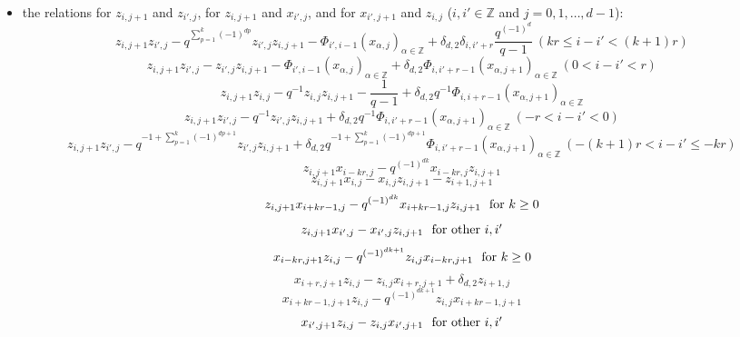 \documentclass[reqno,12pt,a4paper]{amsart}
\theoremstyle{remark}
\theoremstyle{definition}
\numberwithin{equation}{section}
\begin{document}
\begin{itemize}
	
	\item[(2)] the relations for $z_{i,j+1}$ and $z_{i',j}$, for $z_{i,j+1}$ and $x_{i',j}$, and for $x_{i',j+1}$ and $z_{i,j}$ ($i,i'\in\mathbb{Z}$ and $j=0,1,\ldots,d-1$):
	\begin{equation*}
		z_{i,j+1}z_{i',j}-q^{\sum\limits_{p=1}^{k}(-1)^{dp}  }z_{i',j}z_{i,j+1}-\Phi_{i',i-1}(x_{\alpha,j})_{\alpha\in\mathbb{Z}}+\delta_{d,2}\delta_{i,i'+r}\frac{q^{(-1)^d}}{q-1}~(kr\leq i-i'<(k+1)r)
	\end{equation*}
	\begin{equation}\label{relation:simple-by-projectives-$r>1$}
		z_{i,j+1}z_{i',j}-z_{i',j}z_{i,j+1}-\Phi_{i',i-1}(x_{\alpha,j})_{\alpha\in\mathbb{Z}}+\delta_{d,2}\Phi_{i,i'+r-1}(x_{\alpha,j+1})_{\alpha\in\mathbb{Z}}~(0< i-i'<r)
	\end{equation}
	\begin{equation*}
		z_{i,j+1}z_{i,j}-q^{-1}z_{i,j}z_{i,j+1}-\frac{1}{q-1}+\delta_{d,2}q^{-1}\Phi_{i,i+r-1}(x_{\alpha,j+1})_{\alpha\in\mathbb{Z}}
	\end{equation*}
	\begin{equation*}
		z_{i,j+1}z_{i',j}-q^{-1}z_{i',j}z_{i,j+1}+\delta_{d,2}q^{-1}\Phi_{i,i'+r-1}(x_{\alpha,j+1})_{\alpha\in\mathbb{Z}}~(-r< i-i'<0)
	\end{equation*}
	\begin{equation*}
		z_{i,j+1}z_{i',j}-q^{-1+\sum\limits_{p=1}^{k}(-1)^{dp+1}}z_{i',j}z_{i,j+1}+\delta_{d,2}q^{-1+\sum\limits_{p=1}^{k}(-1)^{dp+1}}\Phi_{i,i'+r-1}(x_{\alpha,j+1})_{\alpha\in\mathbb{Z}}~(-(k+1)r<i-i'\leq -kr)
	\end{equation*}
	\begin{equation*}
		z_{i,j+1}x_{i-kr,j}-q^{(-1)^{dk}}x_{i-kr,j}z_{i,j+1}
	\end{equation*}
	\begin{equation*}
		z_{i,j+1}x_{i,j}-x_{i,j}z_{i,j+1}-z_{i+1,j+1}
	\end{equation*}
	\begin{equation*}
		z_{i,j+1}x_{i+kr-1,j}-q^{(-1)^{dk}}x_{i+kr-1,j}z_{i,j+1}~\hbox{ for $k\geq 0$} 
	\end{equation*}
	\begin{equation*}
		z_{i,j+1}x_{i',j}-x_{i',j}z_{i,j+1}~\hbox{ for other $i,i'$} 
	\end{equation*}
	\begin{equation*}
		x_{i-kr,j+1}z_{i,j}-q^{(-1)^{dk+1}}z_{i,j}x_{i-kr,j+1}~\hbox{ for $k\geq 0$}  
	\end{equation*}
	\begin{equation*}
		x_{i+r,j+1}z_{i,j}-z_{i,j}x_{i+r,j+1}+\delta_{d,2}z_{i+1,j} 
	\end{equation*}
	\begin{equation*}
		x_{i+kr-1,j+1}z_{i,j}-q^{(-1)^{dk+1}}z_{i,j}x_{i+kr-1,j+1}
	\end{equation*}
		\begin{equation*}
		x_{i',j+1}z_{i,j}-             z_{i,j}x_{i',j+1}~\hbox{ for other $i,i'$} 
	\end{equation*}
	

\end{itemize}
\end{document}
